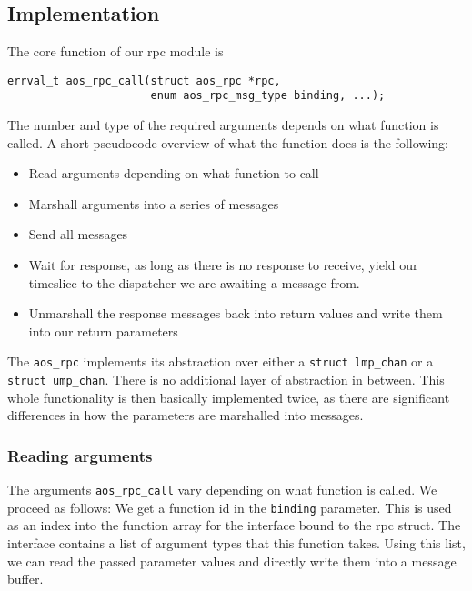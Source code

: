 \subsection{Implementation}
The core function of our rpc module is


\begin{mdframed}[style=myframe]
\begin{verbatim}
errval_t aos_rpc_call(struct aos_rpc *rpc,
                      enum aos_rpc_msg_type binding, ...);
\end{verbatim}
\end{mdframed}

The number and type of the required arguments depends on what function is called.
A short pseudocode overview of what the function does is the following:

\begin{itemize}
    \item Read arguments depending on what function to call
    \item Marshall arguments into a series of messages
    \item Send all messages
    \item Wait for response, as long as there is no response to receive, yield our timeslice to the
          dispatcher we are awaiting a message from.
    \item Unmarshall the response messages back into return values and write them into
          our return parameters
\end{itemize}


The \lstinline{aos_rpc} implements its abstraction over either a \lstinline{struct lmp_chan} or
a \lstinline{struct ump_chan}. There is no additional layer of abstraction in between. This whole
functionality is then basically implemented twice, as there are significant differences in how the
parameters are marshalled into messages.


\subsubsection{Reading arguments}
The arguments \lstinline{aos_rpc_call} vary depending on what function is called. We proceed as follows:
We get a function id in the \lstinline{binding} parameter. This is used as an index into the function array for the interface bound to the rpc struct. The interface contains a list of argument types that
this function takes. Using this list, we can read the passed parameter values and directly write them into a message buffer. 

